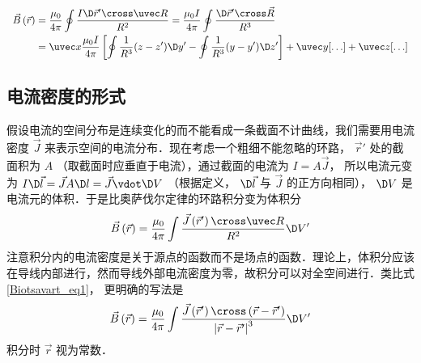 \begin{equation}
\begin{array}{l}
\begin{split}
\vec B\left( {\vec r} \right) &= \frac{{{\mu _0}}}{{4\pi }}\oint {\frac{{I\D \vec r' \cross \uvec R}}{{{R^2}}}} 
= \frac{{{\mu _0}I}}{{4\pi }}\oint {\frac{{\D \vec r' \cross \vec R}}{{{R^3}}}} \\
&= \uvec x\frac{{{\mu _0}I}}{{4\pi }}\left[ {\oint {\frac{1}{{{R^3}}}} (z - z')\D y' - \oint {\frac{1}{{{R^3}}}} (y - y')\D z'} \right] + \uvec y[{\dots}] + \uvec z[ {\dots} ]
\end{split}
\end{array}
\end{equation} 


\subsection{电流密度的形式}
假设电流的空间分布是连续变化的而不能看成一条截面不计曲线，我们需要用电流密度 $\vec J$ 来表示空间的电流分布．现在考虑一个粗细不能忽略的环路， $\vec r'$ 处的截面积为 $A$ （取截面时应垂直于电流），通过截面的电流为 $I = A\vec J$， 所以电流元变为 $I\D \vec l = \vec JA\D l = \vec J \vdot \D V$ （根据定义， $\D \vec l$ 与 $\vec J$ 的正方向相同）， $\D V$ 是电流元的体积．于是比奥萨伐尔定律的环路积分变为体积分
\begin{equation}
\vec B\left( {\vec r} \right) = \frac{{{\mu _0}}}{{4\pi }}\int {\frac{{\vec J\left( {\vec r'} \right) \cross \uvec R}}{{{R^2}}}\D V'}  
\end{equation}
注意积分内的电流密度是关于源点的函数而不是场点的函数．理论上，体积分应该在导线内部进行，然而导线外部电流密度为零，故积分可以对全空间进行．类比式\autoref{Biotsavart_eq1}， 更明确的写法是
\begin{equation}
\vec B\left( {\vec r} \right) = \frac{{{\mu _0}}}{{4\pi }}\int {\frac{{\vec J\left( {\vec r'} \right) \cross \left( {\vec r - \vec r'} \right)}}{{{{\left| {\vec r - \vec r'} \right|}^3}}}\D V'} 
\end{equation}
积分时 $\vec r$ 视为常数．

